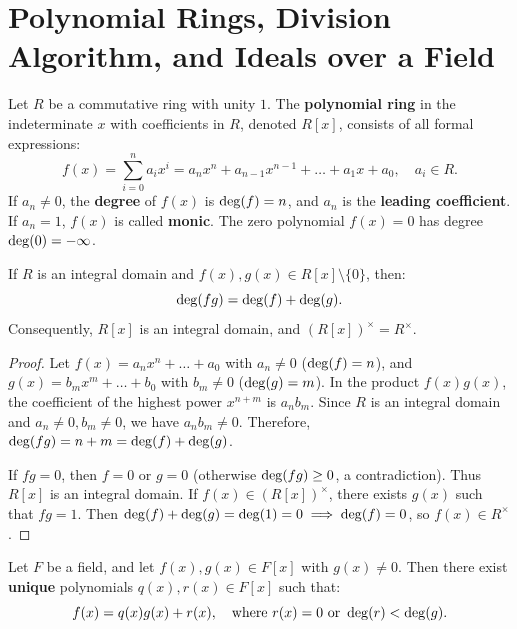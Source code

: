 \section{Polynomial Rings, Division Algorithm, and Ideals over a Field}
\label{sec:polynomial_rings}

\begin{definition}
Let $R$ be a commutative ring with unity $1$. The \textbf{polynomial ring} in the indeterminate $x$ with coefficients in $R$, denoted $R[x]$, consists of all formal expressions:
\begin{equation}
f(x) = \sum_{i=0}^n a_i x^i = a_n x^n + a_{n-1} x^{n-1} + \dots + a_1 x + a_0, \quad a_i \in R.
\end{equation}
If $a_n \ne 0$, the \textbf{degree} of $f(x)$ is $\operatorname{deg}(f) = n$, and $a_n$ is the \textbf{leading coefficient}. If $a_n = 1$, $f(x)$ is called \textbf{monic}. The zero polynomial $f(x) = 0$ has degree $\operatorname{deg}(0) = -\infty$.
\end{definition}

\begin{proposition}
\label{prop:poly_degree}
If $R$ is an integral domain and $f(x), g(x) \in R[x] \setminus \{0\}$, then:
\begin{equation}
\operatorname{deg}(fg) = \operatorname{deg}(f) + \operatorname{deg}(g).
\end{equation}
Consequently, $R[x]$ is an integral domain, and $(R[x])^\times = R^\times$.
\end{proposition}

\begin{proof}
Let $f(x) = a_n x^n + \dots + a_0$ with $a_n \ne 0$ ($\operatorname{deg}(f) = n$), and $g(x) = b_m x^m + \dots + b_0$ with $b_m \ne 0$ ($\operatorname{deg}(g) = m$).
In the product $f(x)g(x)$, the coefficient of the highest power $x^{n+m}$ is $a_n b_m$.
Since $R$ is an integral domain and $a_n \ne 0, b_m \ne 0$, we have $a_n b_m \ne 0$.
Therefore, $\operatorname{deg}(fg) = n + m = \operatorname{deg}(f) + \operatorname{deg}(g)$.

If $fg = 0$, then $f = 0$ or $g = 0$ (otherwise $\operatorname{deg}(fg) \ge 0$, a contradiction).
Thus $R[x]$ is an integral domain.
If $f(x) \in (R[x])^\times$, there exists $g(x)$ such that $fg = 1$.
Then $\operatorname{deg}(f) + \operatorname{deg}(g) = \operatorname{deg}(1) = 0 \implies \operatorname{deg}(f) = 0$, so $f(x) \in R^\times$.
\end{proof}

\begin{theorem}
\label{thm:poly_div_alg}
Let $F$ be a field, and let $f(x), g(x) \in F[x]$ with $g(x) \ne 0$.
Then there exist \textbf{unique} polynomials $q(x), r(x) \in F[x]$ such that:
\begin{equation}
f(x) = q(x) g(x) + r(x), \quad \text{where } r(x) = 0 \text{ or } \operatorname{deg}(r) < \operatorname{deg}(g).
\end{equation}
\end{theorem}

